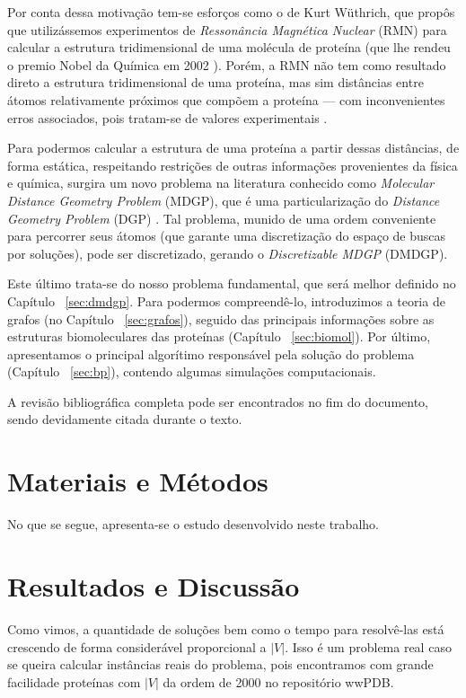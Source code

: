 \documentclass[a4paper,12pt]{article}
\begin{document}
	Por conta dessa motivação tem-se esforços como o de Kurt Wüthrich, que propôs que utilizássemos experimentos de \textit{Ressonância Magnética Nuclear}
	(RMN) para calcular a estrutura tridimensional de uma molécula de proteína (que lhe rendeu o premio Nobel da Química em 2002 \cite{RMNproteinWrutrich}). Porém, a RMN não tem como resultado direto a estrutura tridimensional de uma proteína, mas sim distâncias entre átomos relativamente próximos que compõem a proteína --- com inconvenientes erros associados, pois tratam-se de valores experimentais \cite{carlile:MinimalOrder}.
	
	Para podermos calcular a estrutura de uma proteína a partir dessas distâncias, de forma estática, respeitando restrições de outras informações provenientes da física e química, surgira um novo problema na literatura conhecido como \textit{Molecular Distance Geometry Problem} (MDGP), que é uma particularização do \textit{Distance Geometry Problem} (DGP) \cite{carlileGDandAplications}. Tal problema, munido de uma ordem conveniente para percorrer seus átomos (que garante uma discretização do espaço de buscas por soluções), pode ser discretizado, gerando o \textit{Discretizable MDGP} (DMDGP).
	
	Este último trata-se do nosso problema fundamental, que será melhor definido no Capítulo ~\ref{sec:dmdgp}. Para podermos compreendê-lo, introduzimos a teoria de grafos (no Capítulo ~\ref{sec:grafos}), seguido das principais informações sobre as estruturas biomoleculares das proteínas (Capítulo ~\ref{sec:biomol}). Por último, apresentamos o principal algorítimo responsável pela solução do problema (Capítulo ~\ref{sec:bp}), contendo algumas simulações computacionais.
	
	A revisão bibliográfica completa pode ser encontrados no fim do documento, sendo devidamente citada durante o texto. 
	
	\newpage
	
	\section*{Materiais e Métodos}
	No que se segue, apresenta-se o estudo desenvolvido neste trabalho.
	
	
	
	\newpage
	
	

		\newpage
	\section{Resultados e Discussão \label{sec:disc}}
	Como vimos, a quantidade de soluções bem como o tempo para resolvê-las está crescendo de forma considerável proporcional a $|V|$. Isso é um problema real caso se queira calcular instâncias reais do problema, pois encontramos com grande facilidade proteínas com $|V|$ da ordem de 2000 no repositório wwPDB.
	
\end{document}
